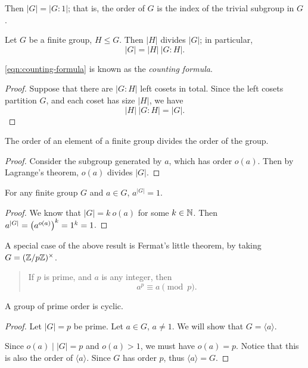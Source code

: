 Then $|G|=|G:1|$; that is, the order of $G$ is the index of the trivial subgroup in $G$.

\begin{theorem}
Let $G$ be a finite group, $H\le G$. Then $|H|$ divides $|G|$; in particular,
\begin{equation}\label{eqn:counting-formula}
|G|=|H|\:|G:H|.
\end{equation}
\end{theorem}

\eqref{eqn:counting-formula} is known as the \emph{counting formula}.

\begin{proof}
Suppose that there are $|G:H|$ left cosets in total. Since the left cosets partition $G$, and each coset has size $|H|$, we have
\[|H|\:|G:H|=|G|.\]
\end{proof}

\begin{corollary}
The order of an element of a finite group divides the order of the group.
\end{corollary}

\begin{proof}
Consider the subgroup generated by $a$, which has order $o(a)$. Then by Lagrange's theorem, $o(a)$ divides $|G|$.
\end{proof}

\begin{corollary}
For any finite group $G$ and $a\in G$, $a^{|G|}=1$.
\end{corollary}

\begin{proof}
We know that $|G|=k\:o(a)$ for some $k\in\mathbb N$. Then $a^{|G|}=\left(a^{o(a)}\right)^k=1^k=1$.
\end{proof}

A special case of the above result is Fermat's little theorem, by taking $G=(\mathbb Z/p\mathbb Z)^\times$.
\begin{quote}
If $p$ is prime, and $a$ is any integer, then
\[a^p\equiv a\pmod p.\]
\end{quote}

\begin{corollary}
A group of prime order is cyclic.
\end{corollary}

\begin{proof}
Let $|G|=p$ be prime. Let $a\in G$, $a\neq1$. We will show that $G=\langle a\rangle$.

Since $o(a)\mid |G|=p$ and $o(a)>1$, we must have $o(a)=p$. Notice that this is also the order of $\langle a\rangle$. Since $G$ has order $p$, thus $\langle a\rangle=G$.
\end{proof}


